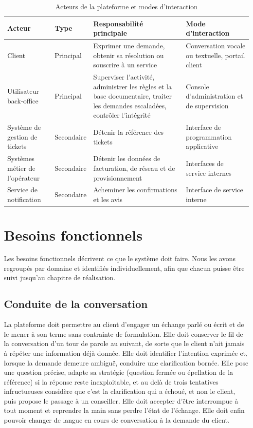 \begin{table}[H]
\centering
\renewcommand{\arraystretch}{1.25}
\begin{tabular}{|p{2.6cm}|p{2.2cm}|p{4.4cm}|p{4.6cm}|}
\hline
\textbf{Acteur} & \textbf{Type} & \textbf{Responsabilité principale} & \textbf{Mode d'interaction} \\
\hline
Client & Principal & Exprimer une demande, obtenir sa résolution ou souscrire à un service & Conversation vocale ou textuelle, portail client \\
\hline
Utilisateur back-office & Principal & Superviser l'activité, administrer les règles et la base documentaire, traiter les demandes escaladées, contrôler l'intégrité & Console d'administration et de supervision \\
\hline
Système de gestion de tickets & Secondaire & Détenir la référence des tickets & Interface de programmation applicative \\
\hline
Systèmes métier de l'opérateur & Secondaire & Détenir les données de facturation, de réseau et de provisionnement & Interfaces de service internes \\
\hline
Service de notification & Secondaire & Acheminer les confirmations et les avis & Interface de service interne \\
\hline
\end{tabular}
\caption{Acteurs de la plateforme et modes d'interaction}
\label{tab:acteurs}
\end{table}

\section{Besoins fonctionnels}

Les besoins fonctionnels décrivent ce que le système doit faire. Nous les avons regroupés par domaine et identifiés individuellement, afin que chacun puisse être suivi jusqu'au chapitre de réalisation.

\subsection{Conduite de la conversation}

La plateforme doit permettre au client d'engager un échange parlé ou écrit et de le mener à son terme sans contrainte de formulation. Elle doit conserver le fil de la conversation d'un tour de parole au suivant, de sorte que le client n'ait jamais à répéter une information déjà donnée. Elle doit identifier l'intention exprimée et, lorsque la demande demeure ambiguë, conduire une clarification bornée. Elle pose une question précise, adapte sa stratégie (question fermée ou épellation de la référence) si la réponse reste inexploitable, et au delà de trois tentatives infructueuses considère que c'est la clarification qui a échoué, et non le client, puis propose le passage à un conseiller. Elle doit accepter d'être interrompue à tout moment et reprendre la main sans perdre l'état de l'échange. Elle doit enfin pouvoir changer de langue en cours de conversation à la demande du client.

